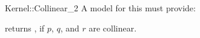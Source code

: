 \begin{ccRefFunctionObjectConcept}{Kernel::Collinear_2}
A model for this must provide:


{returns , if $p$, $q$, and $r$ are collinear.}

\ccIsModel{}

\end{ccRefFunctionObjectConcept}
